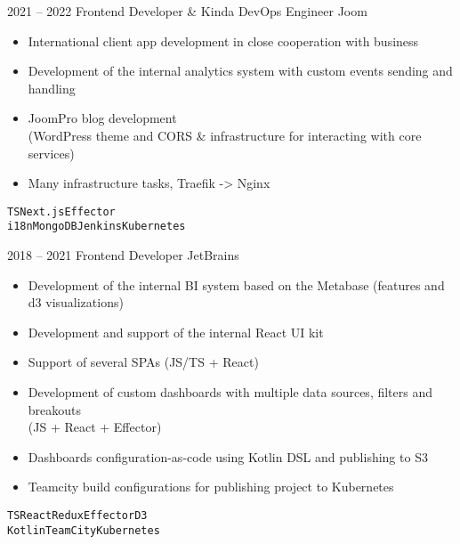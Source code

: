 \documentclass[10pt]{template}
\begin{document}
\begin{entrylist}
	\entry
	{2021 -- 2022}
	{Frontend Developer \& Kinda DevOps Engineer}
	{Joom}
	{
	        \begin{itemize}[noitemsep,topsep=5pt,leftmargin=8pt]
		        \item International client app development in close cooperation with business
		        \item Development of the internal analytics system with custom events sending and handling
			\item JoomPro blog development\\ (WordPress theme and CORS \& infrastructure for interacting with core services)
		        \item Many infrastructure tasks, Traefik -> Nginx
		\end{itemize}
		\texttt{TS}\slashsep\texttt{Next.js}\slashsep\texttt{Effector}\\
		{\color{gray}\texttt{i18n}\slashsep\texttt{MongoDB}\slashsep\texttt{Jenkins}\slashsep\texttt{Kubernetes}}}
	\entry
	{2018 -- 2021}
	{Frontend Developer}
	{JetBrains}
	{
	        \begin{itemize}[noitemsep,topsep=5pt,leftmargin=8pt]
		        \item Development of the internal BI system based on the Metabase (features and d3 visualizations)
		        \item Development and support of the internal React UI kit
		        \item Support of several SPAs (JS/TS + React)
		        \item Development of custom dashboards with multiple data sources, filters and breakouts\\ (JS + React + Effector)\\ 
		        \item Dashboards configuration-as-code using Kotlin DSL and publishing to S3
		        \item Teamcity build configurations for publishing project to Kubernetes
		\end{itemize}
		\texttt{TS}\slashsep\texttt{React}\slashsep\texttt{Redux}\slashsep\texttt{Effector}\slashsep\texttt{D3}\\
		{\color{gray} \texttt{Kotlin}\slashsep\texttt{TeamCity}\slashsep\texttt{Kubernetes}}}
\end{entrylist}
\end{document}
